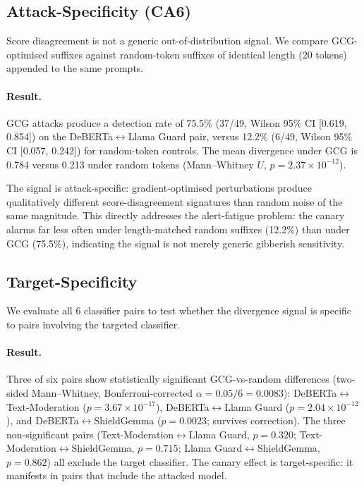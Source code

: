\subsection{Attack-Specificity (CA6)}
\label{sec:ca6}

Score disagreement is not a generic out-of-distribution signal. We compare GCG-optimised suffixes against random-token suffixes of identical length (20 tokens) appended to the same prompts.

\paragraph{Result.} GCG attacks produce a detection rate of 75.5\% (37/49, Wilson 95\% CI [0.619, 0.854]) on the DeBERTa$\leftrightarrow$Llama Guard pair, versus 12.2\% (6/49, Wilson 95\% CI [0.057, 0.242]) for random-token controls. The mean divergence under GCG is 0.784 versus 0.213 under random tokens (Mann--Whitney $U$, $p = 2.37 \times 10^{-12}$).

The signal is attack-specific: gradient-optimised perturbations produce qualitatively different score-disagreement signatures than random noise of the same magnitude. This directly addresses the alert-fatigue problem: the canary alarms far less often under length-matched random suffixes (12.2\%) than under GCG (75.5\%), indicating the signal is not merely generic gibberish sensitivity.

\subsection{Target-Specificity}
\label{sec:target-specificity}

We evaluate all 6 classifier pairs to test whether the divergence signal is specific to pairs involving the targeted classifier.

\paragraph{Result.} Three of six pairs show statistically significant GCG-vs-random differences (two-sided Mann--Whitney, Bonferroni-corrected $\alpha = 0.05/6 = 0.0083$): DeBERTa$\leftrightarrow$Text-Moderation ($p = 3.67 \times 10^{-17}$), DeBERTa$\leftrightarrow$Llama Guard ($p = 2.04 \times 10^{-12}$), and DeBERTa$\leftrightarrow$ShieldGemma ($p = 0.0023$; survives correction). The three non-significant pairs (Text-Moderation$\leftrightarrow$Llama Guard, $p = 0.320$; Text-Moderation$\leftrightarrow$ShieldGemma, $p = 0.715$; Llama Guard$\leftrightarrow$ShieldGemma, $p = 0.862$) all exclude the target classifier. The canary effect is target-specific: it manifests in pairs that include the attacked model.

